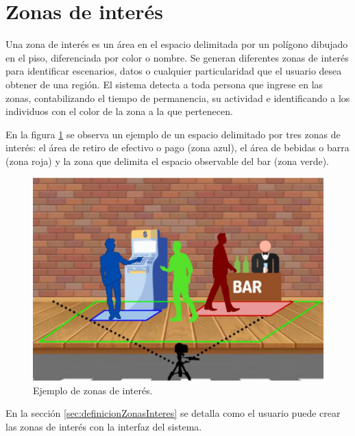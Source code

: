 \newpage

\section{Zonas de interés}
\label{sec:zonasInteres}

Una zona de interés es un área en el espacio delimitada por un polígono dibujado en el piso, diferenciada por color o nombre. Se generan diferentes zonas de interés para identificar escenarios, datos o cualquier particularidad que el usuario desea obtener de una región. El sistema detecta a toda persona que ingrese en las zonas, contabilizando el tiempo de permanencia, su actividad e identificando a los individuos con el color de la zona a la que pertenecen.

En la figura \ref{fig:zonasInteres} se observa un ejemplo de un espacio delimitado por tres zonas de interés: el área de retiro de efectivo o pago (zona azul), el área de bebidas o barra (zona roja) y la zona que delimita el espacio observable del bar (zona verde).

\begin{figure}[ht]
	\centering
	\includegraphics[scale=1.2]{./Figures/zonasInteres.jpg}
	\caption{Ejemplo de zonas de interés.}
	\label{fig:zonasInteres}
\end{figure}

En la sección \ref{sec:definicionZonasInteres} se detalla como el usuario puede crear las zonas de interés con la interfaz del sistema.